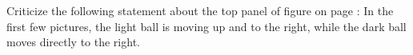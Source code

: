 Criticize the following statement about the top panel of figure  on page \pageref{fig:possible}:
In the first few pictures, the light ball is moving up and to the right, while the dark ball moves directly to the
right.

